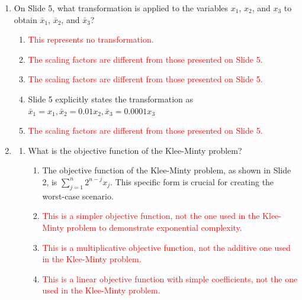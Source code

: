 \documentclass{article}%
\newcommand{\incorrect}[1]{\textcolor{red}{#1}}
\begin{document}
\begin{enumerate}
\begin{enumerate}
\item \incorrect{This is incorrect; the coefficient of $x_1$ in the first constraint is 1.}%
\item \incorrect{This is incorrect; the coefficient of $x_1$ in the first constraint is 1.}%
\item \incorrect{This is incorrect; the coefficient of $x_1$ in the first constraint is 1.}%
\item \incorrect{This is incorrect; the coefficient of $x_1$ in the first constraint is 1.}%
\end{enumerate}%
\vspace{1em}%
\item On Slide 5, what transformation is applied to the variables $x_1$, $x_2$, and $x_3$ to obtain $\bar{x}_1$, $\bar{x}_2$, and $\bar{x}_3$?%
\begin{enumerate}%
\item \incorrect{This represents no transformation.}%
\item \incorrect{The scaling factors are different from those presented on Slide 5.}%
\item \incorrect{The scaling factors are different from those presented on Slide 5.}%
\item Slide 5 explicitly states the transformation as $\bar{x}_1 = x_1, \bar{x}_2 = 0.01x_2, \bar{x}_3 = 0.0001x_3$%
\item \incorrect{The scaling factors are different from those presented on Slide 5.}%
\end{enumerate}%
\vspace{1em}%
\item%
\begin{enumerate}%
\item What is the objective function of the Klee-Minty problem?%
\begin{enumerate}%
\item The objective function of the Klee-Minty problem, as shown in Slide 2, is $\sum_{j=1}^n 2^{n-j} x_j$. This specific form is crucial for creating the worst-case scenario.%
\item \incorrect{This is a simpler objective function, not the one used in the Klee-Minty problem to demonstrate exponential complexity.}%
\item \incorrect{This is a multiplicative objective function, not the additive one used in the Klee-Minty problem.}%
\item \incorrect{This is a linear objective function with simple coefficients, not the one used in the Klee-Minty problem.}%

\end{enumerate}
\end{enumerate}
\end{enumerate}
\end{document}
